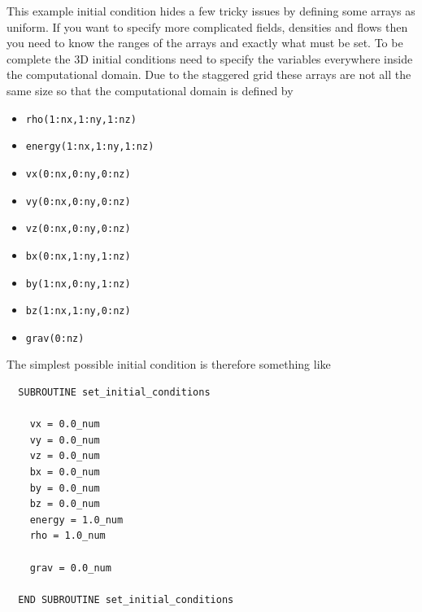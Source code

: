 \documentclass[11pt]{article}
\begin{document}
This example initial condition hides a few tricky issues by defining some arrays as uniform. If you want to specify more complicated fields, densities and flows then you need to know the ranges of the arrays and exactly what must be set. To be complete the 3D initial conditions need to specify the variables everywhere inside the computational domain. Due to the staggered grid these arrays are not all the same size so that the computational domain is defined by
\begin{itemize}
\item \texttt{rho(1:nx,1:ny,1:nz)}
\item \texttt{energy(1:nx,1:ny,1:nz)}
\item \texttt{vx(0:nx,0:ny,0:nz)}
\item \texttt{vy(0:nx,0:ny,0:nz)}
\item \texttt{vz(0:nx,0:ny,0:nz)}
\item \texttt{bx(0:nx,1:ny,1:nz)}
\item \texttt{by(1:nx,0:ny,1:nz)}
\item \texttt{bz(1:nx,1:ny,0:nz)}
\item \texttt{grav(0:nz)}  
\end{itemize}              

The simplest possible initial condition is therefore something like
\begin{verbatim}
  SUBROUTINE set_initial_conditions

    vx = 0.0_num
    vy = 0.0_num
    vz = 0.0_num
    bx = 0.0_num
    by = 0.0_num
    bz = 0.0_num
    energy = 1.0_num
    rho = 1.0_num

    grav = 0.0_num

  END SUBROUTINE set_initial_conditions  
\end{verbatim}
\end{document}
